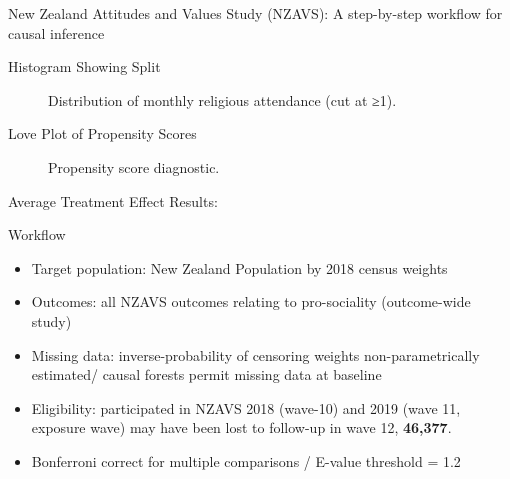 \documentclass[
  ignorenonframetext,
  aspectratio=169,
]{beamer}
\providecommand{\tightlist}{%
  \setlength{\itemsep}{0pt}\setlength{\parskip}{0pt}}
\begin{document}
\begin{frame}[fragile]{New Zealand Attitudes and Values Study (NZAVS): A
step-by-step workflow for causal inference}
\begin{block}{Histogram Showing Split}
\label{histogram-showing-split}
\begin{figure}


\caption{\label{fig-graph-cut}Distribution of monthly religious
attendance (cut at ≥1).}

\end{figure}%
\end{block}

\begin{block}{Love Plot of Propensity Scores}
\label{love-plot-of-propensity-scores}
\begin{figure}


\caption{\label{fig-propensity}Propensity score diagnostic.}

\end{figure}%
\end{block}

\begin{block}{Average Treatment Effect Results:}
\label{average-treatment-effect-results}
\end{block}

\begin{block}{Workflow}
\label{workflow}
\begin{itemize}
\tightlist
\item
  Target population: New Zealand Population by 2018 census weights
\item
  Outcomes: all NZAVS outcomes relating to pro-sociality (outcome-wide
  study)
\item
  Missing data: inverse-probability of censoring weights
  non-parametrically estimated/ causal forests permit missing data at
  baseline
\item
  Eligibility: participated in NZAVS 2018 (wave-10) and 2019 (wave 11,
  exposure wave) may have been lost to follow-up in wave 12,
  \textbf{46,377}.
\item
  Bonferroni correct for multiple comparisons / E-value threshold = 1.2
\end{itemize}
\end{block}


\end{frame}
\end{document}
